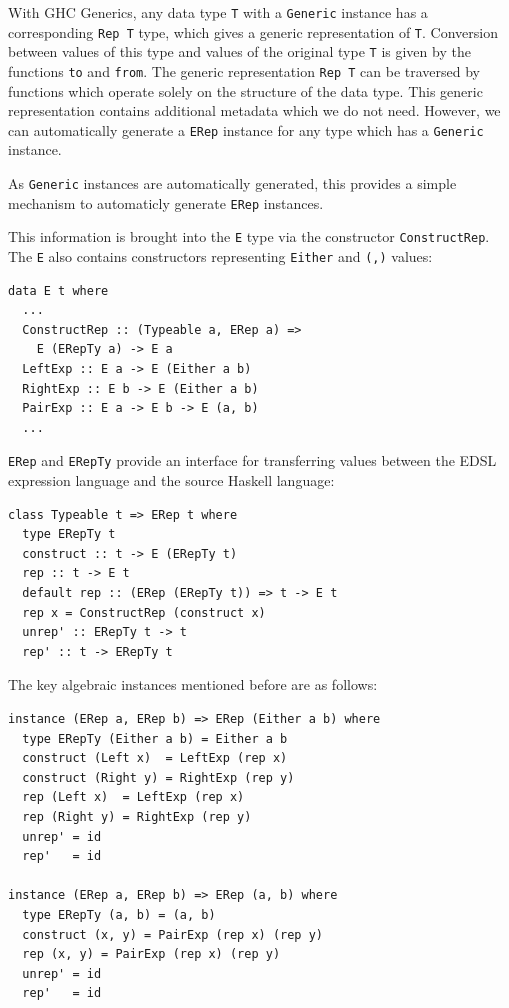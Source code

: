 \documentclass[runningheads, a4paper]{llncs}
\newcommand{\ttt}{\texttt}
\begin{document}
With GHC Generics, any data type \ttt{T} with a \ttt{Generic} instance has a
corresponding \ttt{Rep T} type, which gives a generic representation of \ttt{T}.
Conversion between values of this type and values of the original type \ttt{T} is
given by the functions \ttt{to} and \ttt{from}. The generic representation \ttt{Rep T}
can be traversed by functions which operate solely on the structure of the data type.
This generic representation contains additional metadata which we do not need.
However, we can automatically generate a \ttt{ERep} instance for any type which
has a \ttt{Generic} instance.

As \ttt{Generic} instances are automatically generated, this provides a simple mechanism
to automaticly generate \ttt{ERep} instances.


This information is brought into the \ttt{E} type via the constructor
\ttt{ConstructRep}. The \ttt{E} also contains constructors representing \ttt{Either}
and \ttt{(,)} values:

\begin{lstlisting}
data E t where
  ...
  ConstructRep :: (Typeable a, ERep a) =>
    E (ERepTy a) -> E a
  LeftExp :: E a -> E (Either a b)
  RightExp :: E b -> E (Either a b)
  PairExp :: E a -> E b -> E (a, b)
  ...
\end{lstlisting}

\noindent \ttt{ERep} and \ttt{ERepTy} provide an interface for transferring values between the EDSL
expression language and the source Haskell language:

\begin{lstlisting}
class Typeable t => ERep t where
  type ERepTy t
  construct :: t -> E (ERepTy t)
  rep :: t -> E t
  default rep :: (ERep (ERepTy t)) => t -> E t
  rep x = ConstructRep (construct x)
  unrep' :: ERepTy t -> t
  rep' :: t -> ERepTy t
\end{lstlisting}

\noindent The key algebraic instances mentioned before are as follows:

\begin{lstlisting}
instance (ERep a, ERep b) => ERep (Either a b) where
  type ERepTy (Either a b) = Either a b
  construct (Left x)  = LeftExp (rep x)
  construct (Right y) = RightExp (rep y)
  rep (Left x)  = LeftExp (rep x)
  rep (Right y) = RightExp (rep y)
  unrep' = id
  rep'   = id

instance (ERep a, ERep b) => ERep (a, b) where
  type ERepTy (a, b) = (a, b)
  construct (x, y) = PairExp (rep x) (rep y)
  rep (x, y) = PairExp (rep x) (rep y)
  unrep' = id
  rep'   = id
\end{lstlisting}
\end{document}
